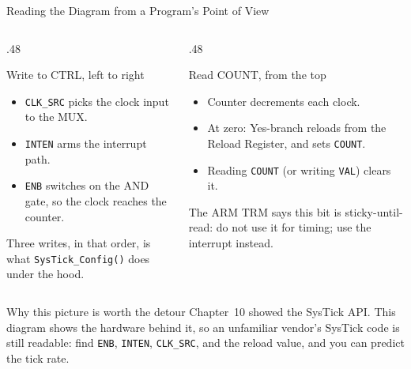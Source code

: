 \documentclass[9pt,aspectratio=169,xcolor=table]{beamer}
\begin{document}
{\beamerextras
\begin{frame}{Reading the Diagram from a Program's Point of View}
    \begin{columns}[T]
    \begin{column}{.48\textwidth}
        \begin{block}{Write to CTRL, left to right}
            {\small
            \begin{itemize}\itemsep1pt
                \item \texttt{CLK\_SRC} picks the clock input to the MUX.
                \item \texttt{INTEN} arms the interrupt path.
                \item \texttt{ENB} switches on the AND gate, so the clock
                      reaches the counter.
            \end{itemize}}
        \end{block}

        \vspace{2mm}
        {\small Three writes, in that order, is what \texttt{SysTick\_Config()}
        does under the hood.}
    \end{column}
    \begin{column}{.48\textwidth}
        \begin{block}{Read COUNT, from the top}
            {\small
            \begin{itemize}\itemsep1pt
                \item Counter decrements each clock.
                \item At zero: Yes-branch reloads from the Reload Register,
                      and sets \texttt{COUNT}.
                \item Reading \texttt{COUNT} (or writing \texttt{VAL})
                      clears it.
            \end{itemize}}
        \end{block}

        \vspace{2mm}
        {\small The ARM TRM says this bit is \alert{sticky-until-read}: do
        not use it for timing; use the interrupt instead.}
    \end{column}
    \end{columns}

    \vspace{3mm}
    \begin{block}{Why this picture is worth the detour}
        {\small Chapter~10 showed the SysTick API. This diagram shows the
        hardware behind it, so an unfamiliar vendor's SysTick code is
        still readable: find \texttt{ENB}, \texttt{INTEN},
        \texttt{CLK\_SRC}, and the reload value, and you can predict the
        tick rate.}
    \end{block}
\end{frame}
}
\end{document}
